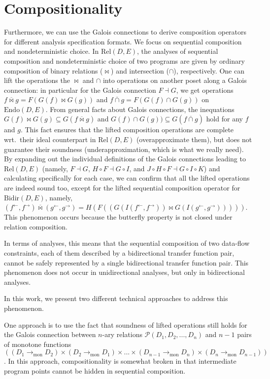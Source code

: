 \documentclass{easychair}
\theoremstyle{definition}
\newcommand{\Pow}{\mathcal{P}}
\newcommand{\Rel}{\mathrm{Rel}}
\newcommand{\Endo}{\mathrm{Endo}}
\newcommand{\Bidir}{\mathrm{Bidir}}
\newcommand{\tomon}{\to_{\mathrm{mon}}}
\newcommand{\ff}{{f^{\rightarrow}}}
\newcommand{\fb}{{f^{\leftarrow}}}
\newcommand{\gf}{{g^{\rightarrow}}}
\newcommand{\gb}{{g^{\leftarrow}}}
\newcommand{\comp}{\circ}
\newcommand{\bowtielift}{\mathbin{\overline{\bowtie}}}
\newcommand{\caplift}{\mathbin{\overline{\cap}}}
\begin{document}
\section{Compositionality}

Furthermore, we can use the Galois connections to derive composition operators for different analysis specification formats. We focus on sequential composition and nondeterministic choice. In $\Rel(D, E)$,
the analyses of sequential composition and nondeterministic choice of two programs are given by ordinary composition of binary relations ($\bowtie$) and intersection ($\cap$), respectively. One can lift the operations the $\bowtie$ and $\cap$
into operations on another poset along a Galois connection: in particular for the Galois connection $F \dashv G$, we get operations $f \bowtielift g = F (G(f) \bowtie G(g))$ and $f \caplift g = F(G (f) \cap G(g))$ on $\Endo(D,E)$.
From general facts about Galois connections, the inequations
$G(f) \bowtie G(g) \subseteq G (f \bowtielift g)$ and $G(f) \cap G(g)) \subseteq G(f \caplift g)$ hold for any $f$ and $g$.
This fact ensures that the lifted composition operations are complete wrt.\ their ideal counterpart in $\Rel(D, E)$ (overapproximate them), but does not guarantee their soundness (underapproximation, which is what we really need).
By expanding out the individual definitions of the Galois connections leading to $\Rel(D ,E)$ (namely, $F \dashv G$, $H \comp F \dashv G \comp I$, and $J \comp H \comp F \dashv G \comp I \comp K$) and calculating specifically for each case, we can confirm that all the lifted operations are indeed sound too, except for the lifted sequential composition operator for $\Bidir(D, E)$, namely, $(\fb , \ff) \bowtielift (\gb , \gf) = H(F((G(I(\fb , \ff)) \bowtie G(I(\gb , \gf)))))$. This phenomenon occurs because the butterfly property is not closed under relation composition.

In terms of analyses, this means that the sequential composition of two data-flow constraints, each of them described by a bidirectional transfer function pair, cannot be safely represented by a single bidirectional transfer function pair. This phenomenon does not occur in unidirectional analyses, but only in bidirectional analyses.

In this work, we present two different technical approaches to address this phenomenon.

One approach is to use the fact that soundness of lifted operations still holds for the Galois connection between $n$-ary relations $\Pow(D_{1}, D_{2}, ... , D_{n})$ and $n-1$ pairs of monotone functions $((D_{1} \tomon D_{2}) \times (D_{2} \tomon D_{1}) \times ... \times (D_{n-1} \tomon D_{n}) \times (D_{n} \tomon D_{n-1}))$. In this approach, compositionality is somewhat broken in that intermediate program points cannot be hidden in sequential composition. 
\end{document}

